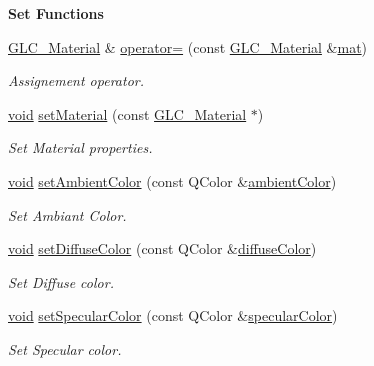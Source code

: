 \begin{Indent}{\bf Set Functions}\par
\begin{DoxyCompactItemize}
\item 
\hyperlink{class_g_l_c___material}{G\-L\-C\-\_\-\-Material} \& \hyperlink{class_g_l_c___material_ab1e46174e23951e0bfdc49bf0ca2e5b3}{operator=} (const \hyperlink{class_g_l_c___material}{G\-L\-C\-\_\-\-Material} \&\hyperlink{uavobjecttemplate_8m_a16a51e808b16c46bbfd36da2e37cd123}{mat})
\begin{DoxyCompactList}\small\item\em Assignement operator. \end{DoxyCompactList}\item 
\hyperlink{group___u_a_v_objects_plugin_ga444cf2ff3f0ecbe028adce838d373f5c}{void} \hyperlink{class_g_l_c___material_a78796f9625043ff58c925e2d3ca0c0ce}{set\-Material} (const \hyperlink{class_g_l_c___material}{G\-L\-C\-\_\-\-Material} $\ast$)
\begin{DoxyCompactList}\small\item\em Set Material properties. \end{DoxyCompactList}\item 
\hyperlink{group___u_a_v_objects_plugin_ga444cf2ff3f0ecbe028adce838d373f5c}{void} \hyperlink{class_g_l_c___material_aeb86c11061bda0f93b0da8772b69e287}{set\-Ambient\-Color} (const Q\-Color \&\hyperlink{class_g_l_c___material_a33d042e846e6bbd4abb4d38f859c9f58}{ambient\-Color})
\begin{DoxyCompactList}\small\item\em Set Ambiant Color. \end{DoxyCompactList}\item 
\hyperlink{group___u_a_v_objects_plugin_ga444cf2ff3f0ecbe028adce838d373f5c}{void} \hyperlink{class_g_l_c___material_a2b8263d5c75c7dec7b109a9cce735b80}{set\-Diffuse\-Color} (const Q\-Color \&\hyperlink{class_g_l_c___material_a3d6924655bf86145e451ba03b40d04c2}{diffuse\-Color})
\begin{DoxyCompactList}\small\item\em Set Diffuse color. \end{DoxyCompactList}\item 
\hyperlink{group___u_a_v_objects_plugin_ga444cf2ff3f0ecbe028adce838d373f5c}{void} \hyperlink{class_g_l_c___material_af13ba1d3e168c29b5fdf2b920df46745}{set\-Specular\-Color} (const Q\-Color \&\hyperlink{class_g_l_c___material_a72586c9558073c34fd538dc8efda7e6e}{specular\-Color})
\begin{DoxyCompactList}\small\item\em Set Specular color. \end{DoxyCompactList}\item 

\end{DoxyCompactItemize}
\end{Indent}
